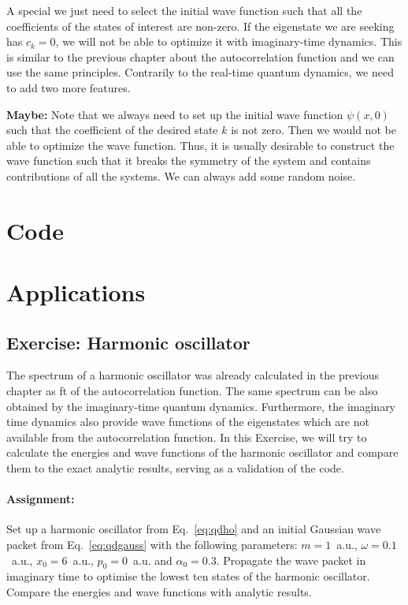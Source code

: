 A special  we just need to select the initial wave function such that all the coefficients of the states of interest are non-zero. If the eigenstate we are seeking has $c_k=0$, we will not be able to optimize it with imaginary-time dynamics. This is similar to the previous chapter about the autocorrelation function and we can use the same principles. Contrarily to the real-time quantum dynamics, we need to add two more features.

\textbf{ Maybe:}
Note that we always need to set up the initial wave function $\psi(x,0)$ such that the coefficient of the desired state $k$ is not zero. Then we would not be able to optimize the wave function. Thus, it is usually desirable to construct the wave function such that it breaks the symmetry of the system and contains contributions of all the systems. We can always add some random noise.

\section{Code}

\lstset{style=mystyle}


\section{Applications}

\subsection*{Exercise: Harmonic oscillator}

The spectrum of a harmonic oscillator was already calculated in the previous chapter as \acrlong{ft} of the autocorrelation function. The same spectrum can be also obtained by the imaginary-time quantum dynamics. Furthermore, the imaginary time dynamics also provide wave functions of the eigenstates which are not available from the autocorrelation function. In this Exercise, we will try to calculate the energies and wave functions of the harmonic oscillator and compare them to the exact analytic results, serving as a validation of the code.

\paragraph{Assignment:} Set up a harmonic oscillator from Eq.~\eqref{eq:qdho} and an initial Gaussian wave packet from Eq.~\eqref{eq:qdgauss} with the following parameters: $m=1$~a.u., $\omega=0.1$~a.u., $x_0=6$~a.u., $p_0=0$~a.u. and $\alpha_0 = 0.3$. Propagate the wave packet in imaginary time to optimise the lowest ten states of the harmonic oscillator. Compare the energies and wave functions with analytic results.

